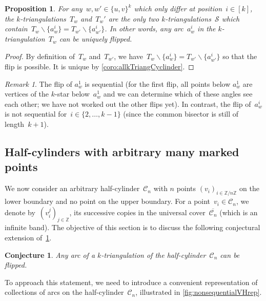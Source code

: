 \documentclass{amsart}
\newtheorem{proposition}[theorem]{Proposition}
\newtheorem{conjecture}[theorem]{Conjecture}
\theoremstyle{remark}
\newtheorem{remark}[theorem]{Remark}
\newcommand{\Z}{\mathbb{Z}} %
\newcommand{\ssm}{\smallsetminus} %
\newcommand{\surface}{\mathcal{S}}
\newcommand{\cylinder}{\mathcal{C}}
\begin{document}
\begin{proposition}
\label{prop:flip2halfCylinder}
For any~$w, w' \in \{u,v\}^k$ which only differ at position~$i \in [k]$, the $k$-triangulations~$T_w$ and~$T_w'$ are the only two $k$-triangulations~$\surface$ which contain~${T_w \ssm \{a_w^i\} = T_{w'} \ssm \{a_{w'}^i\}}$. In other words, any arc~$a_w^i$ in the $k$-triangulation~$T_w$ can be uniquely flipped.
\end{proposition}

\begin{proof}
By definition of~$T_w$ and~$T_{w'}$, we have~${T_w \ssm \{a_w^i\} = T_{w'} \ssm \{a_{w'}^i\}}$ so that the flip is possible.
It is unique by \cref{coro:allkTriangCyclinder}.
\end{proof}

\begin{remark}
The flip of $a_w^1$ is sequential (for the first flip, all points below $a_w^1$ are vertices of the $k$-star below~$a_w^1$ and we can determine which of these angles see each other; we have not worked out the other flips yet).
In contrast, the flip of~$a_w^i$ is not sequential for~$i \in \{2, \dots, k-1\}$ (since the common bisector is still of length~$k+1$).
\end{remark}


\subsection{Half-cylinders with arbitrary many marked points}

We now consider an arbitrary half-cylinder~$\cylinder_n$ with $n$ points $(v_i)_{i \in \Z/n\Z}$ on the lower boundary and no point on the upper boundary. 
For a point~$v_i \in \cylinder_n$, we denote by~$(v_i^j)_{j \in \Z}$, its successive copies in the universal cover~$\overline{\cylinder_n}$ (which is an infinite band).
The objective of this section is to discuss the following conjectural extension of~\cref{prop:flip2halfCylinder}.

\begin{conjecture}
\label{conj:flipHalfCylinder}
Any arc of a $k$-triangulation of the half-cylinder~$\cylinder_n$ can be flipped.
\end{conjecture}

To approach this statement, we need to introduce a convenient representation of collections of arcs on the half-cylinder~$\cylinder_n$, illustrated in \cref{fig:nonsequentialVHrep}.
\end{document}
